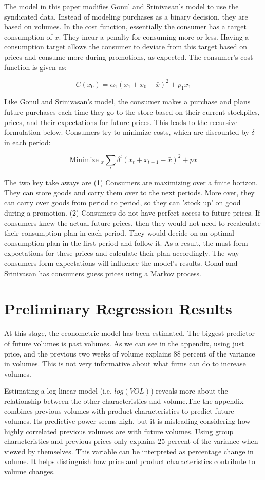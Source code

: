 \documentclass{article}
\begin{document}
The model in this paper modifies Gonul and Srinivasan's model to use the syndicated data. Instead of modeling purchases as a binary decision, they are based on volumes. In the cost function, essentially the consumer has a target consumption of $\bar{x}$. They incur a penalty for consuming more or less. Having a consumption target allows the consumer to deviate from this target based on prices and consume more during promotions, as expected. The consumer's cost function is given as:

$$ C(x_0) = \alpha_1 (x_1 +x_0 - \bar{x})^2 + p_1 x_1 $$

Like Gonul and Srinivasan's model, the consumer makes a purchase and plans future purchases each time they go to the store based on their current stockpiles, prices, and their expectations for future prices. This leads to the recursive formulation below. Consumers try to minimize costs, which are discounted by $\delta$ in each period:

$$ \text{Minimize }_{x} \sum_t \delta^t (x_t + x_{t-1} - \bar{x})^2 + p x $$

The two key take aways are (1) Consumers are maximizing over a finite horizon. They can store goods and carry them over to the next periods. More over, they can carry over goods from period to period, so they can 'stock up' on good during a promotion. (2) Consumers do not have perfect access to future prices. If consumers knew the actual future prices, then they would not need to recalculate their consumption plan in each period. They would decide on an optimal consumption plan in the first period and follow it. As a result, the must form expectations for these prices and calculate their plan accordingly. The way consumers form expectations will influence the model's results. Gonul and Srinivasan has consumers guess prices using a Markov process.


\section{Preliminary Regression Results}

At this stage, the econometric model has been estimated. The biggest predictor of future volumes is past volumes. As we can see in the appendix, using just price, and the previous two weeks of volume explains 88 percent of the variance in volumes. This is not very informative about what firms can do to increase volumes. 

Estimating a log linear model (i.e. $log(VOL)$) reveals more about the relationship between the other characteristics and volume.The the appendix combines previous volumes with product characteristics to predict future volumes. Its predictive power seems high, but it is misleading considering how highly correlated previous volumes are with future volumes. Using group characteristics and previous prices only explains 25 percent of the variance when viewed by themselves.   This variable can be interpreted as percentage change in volume. It helps distinguish how price and product characteristics contribute to volume changes. 
\end{document}
